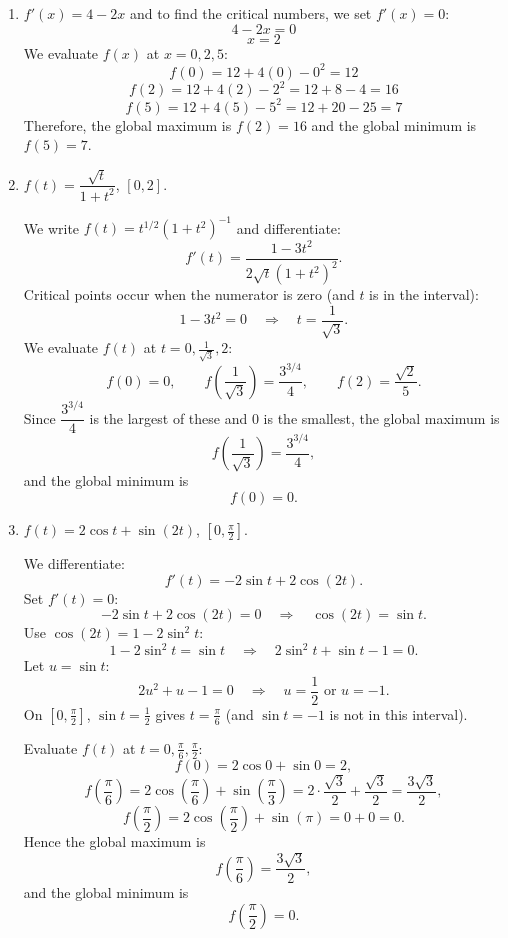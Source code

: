 \begin{Answer}[ref=gloext2]
\begin{enumerate}
	\item $f'(x) = 4-2x$ and to find the critical numbers, we set $f'(x)=0$:
	$$4-2x=0$$
	$$x=2$$
	We evaluate $f(x)$ at $x=0, 2, 5$:
	$$f(0) = 12+4(0)-0^2=12$$
	$$f(2) = 12+4(2)-2^2=12+8-4=16$$
	$$f(5) = 12+4(5)-5^2=12+20-25=7$$
	Therefore, the global maximum is $f(2) = 16$ and the global minimum is $f(5) = 7$.

	\item $f(t) = \dfrac{\sqrt{t}}{1+t^2}$, $[0,2]$.

	We write $f(t) = t^{1/2}(1+t^2)^{-1}$ and differentiate:
	\[
	f'(t) = \frac{1-3t^2}{2\sqrt{t}(1+t^2)^2}.
	\]
	Critical points occur when the numerator is zero (and $t$ is in the interval):
	\[
	1-3t^2 = 0 \quad \Rightarrow \quad t = \frac{1}{\sqrt{3}}.
	\]
	We evaluate $f(t)$ at $t=0, \frac{1}{\sqrt{3}}, 2$:
	\[
	f(0) = 0, \qquad
	f\!\left(\frac{1}{\sqrt{3}}\right) = \frac{3^{3/4}}{4}, \qquad
	f(2) = \frac{\sqrt{2}}{5}.
	\]
	Since $\dfrac{3^{3/4}}{4}$ is the largest of these and $0$ is the smallest, the global maximum is
	\[
	f\!\left(\frac{1}{\sqrt{3}}\right) = \frac{3^{3/4}}{4},
	\]
	and the global minimum is
	\[
	f(0) = 0.
	\]

	\item $f(t) = 2\cos t + \sin(2t)$, $\left[0,\frac{\pi}{2}\right]$.

	We differentiate:
	\[
	f'(t) = -2\sin t + 2\cos(2t).
	\]
	Set $f'(t) = 0$:
	\[
	-2\sin t + 2\cos(2t) = 0
	\quad \Rightarrow \quad
	\cos(2t) = \sin t.
	\]
	Use $\cos(2t) = 1 - 2\sin^2 t$:
	\[
	1 - 2\sin^2 t = \sin t
	\quad \Rightarrow \quad
	2\sin^2 t + \sin t - 1 = 0.
	\]
	Let $u = \sin t$:
	\[
	2u^2 + u - 1 = 0
	\quad \Rightarrow \quad
	u = \frac{1}{2} \text{ or } u = -1.
	\]
	On $\left[0,\frac{\pi}{2}\right]$, $\sin t = \frac{1}{2}$ gives $t = \frac{\pi}{6}$ (and $\sin t = -1$ is not in this interval).

	Evaluate $f(t)$ at $t=0, \frac{\pi}{6}, \frac{\pi}{2}$:
	\[
	f(0) = 2\cos 0 + \sin 0 = 2,
	\]
	\[
	f\!\left(\frac{\pi}{6}\right) = 2\cos\!\left(\frac{\pi}{6}\right) 
	+ \sin\!\left(\frac{\pi}{3}\right)
	= 2\cdot\frac{\sqrt{3}}{2} + \frac{\sqrt{3}}{2}
	= \frac{3\sqrt{3}}{2},
	\]
	\[
	f\!\left(\frac{\pi}{2}\right)
	= 2\cos\!\left(\frac{\pi}{2}\right) + \sin(\pi)
	= 0 + 0 = 0.
	\]
	Hence the global maximum is
	\[
	f\!\left(\frac{\pi}{6}\right) = \frac{3\sqrt{3}}{2},
	\]
	and the global minimum is
	\[
	f\!\left(\frac{\pi}{2}\right) = 0.
	\]


\end{enumerate}
\end{Answer}
